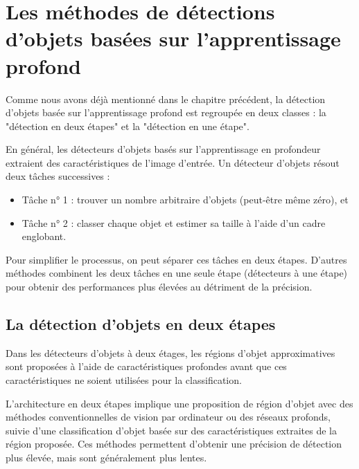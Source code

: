      



          






\section{Les méthodes de détections d'objets basées sur l'apprentissage profond}
Comme nous avons déjà mentionné dans le chapitre précédent, la détection d'objets basée sur l'apprentissage profond est regroupée en deux classes : la "détection en deux étapes" et la "détection en une étape".

En général, les détecteurs d'objets basés sur l'apprentissage en profondeur extraient des caractéristiques de l'image d'entrée. Un détecteur d'objets résout deux tâches successives :
\begin{itemize}
\item  Tâche n° 1 : trouver un nombre arbitraire d'objets (peut-être même zéro), et
\item  Tâche n° 2 : classer chaque objet et estimer sa taille à l'aide d'un cadre englobant.
\end{itemize}

Pour simplifier le processus, on peut séparer ces tâches en deux étapes. D'autres méthodes combinent les deux tâches en une seule étape (détecteurs à une étape) pour obtenir des performances plus élevées au détriment de la précision.

\subsection{La détection d'objets en deux étapes}
 
Dans les détecteurs d'objets à deux étages, les régions d'objet approximatives sont proposées à l'aide de caractéristiques profondes avant que ces caractéristiques ne soient utilisées pour la classification.

     L'architecture en deux étapes implique une proposition de région d'objet avec des méthodes conventionnelles de vision par ordinateur ou des réseaux profonds, suivie d'une classification d'objet basée sur des caractéristiques extraites de la région proposée.   
     Ces méthodes permettent d'obtenir une précision de détection  plus élevée, mais sont généralement plus lentes. 
     
